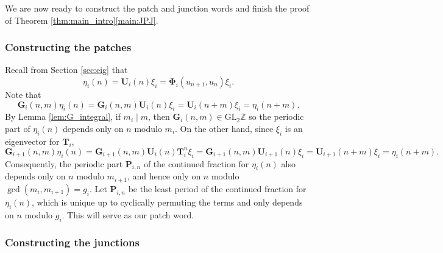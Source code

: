 \documentclass{article}
\numberwithin{equation}{section}
\theoremstyle{definition}
\theoremstyle{remark}
\newcommand{\GL}{\mathrm{GL}}
\newcommand{\ZZ}{\mathbb{Z}}
\newcommand{\<}{\left\langle}
\renewcommand{\>}{\right\rangle}
\begin{document}
We are now ready to construct the patch and junction words and finish the proof of Theorem \ref{thm:main_intro}\ref{main:JPJ}.

\subsubsection{Constructing the patches}

Recall from Section \ref{sec:eig} that
\begin{equation*}
  \eta_i(n) = \mathbf{U}_i(n) \xi_i = \boldsymbol{\Phi}_i(u_{n+1}, u_n) \xi_i.
\end{equation*}
Note that
\begin{equation}\label{eq:G_i}
  \mathbf{G}_i(n, m) \eta_i(n) = \mathbf{G}_i(n, m) \mathbf{U}_i(n) \xi_i = \mathbf{U}_i(n + m) \xi_i = \eta_i(n + m).
\end{equation}
By Lemma \ref{lem:G_integral}, if $m_i \mid m$, then $\mathbf{G}_i(n, m) \in \GL_2\ZZ$ so the periodic part of $\eta_i(n)$ depends only on $n$ modulo $m_i$. On the other hand, since $\xi_i$ is an eigenvector for $\mathbf{T}_i$,
\begin{equation}\label{eq:G_i+1}
  \mathbf{G}_{i+1}(n, m) \eta_i(n) = \mathbf{G}_{i+1}(n, m) \mathbf{U}_i(n) \mathbf{T}_i^n \xi_i = \mathbf{G}_{i+1}(n, m) \mathbf{U}_{i+1}(n) \xi_i = \mathbf{U}_{i+1}(n+m)\xi_i = \eta_i(n+m).
\end{equation}
Consequently, the periodic part $\mathbf{P}_{i,n}$ of the continued fraction for $\eta_i(n)$ also depends only on $n$ modulo $m_{i+1}$, and hence only on $n$ modulo $\gcd(m_i,m_{i+1}) = g_i$. Let $\mathbf{P}_{i,n}$ be the least period of the continued fraction for $\eta_i(n)$, which is unique up to cyclically permuting the terms and only depends on $n$ modulo $g_i$. This will serve as our patch word.

\subsubsection{Constructing the junctions}
\end{document}
